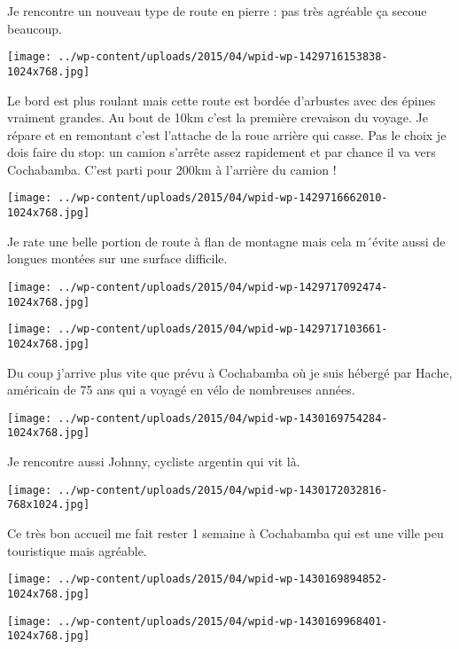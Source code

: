 \pagebreak
 Je rencontre un nouveau type de route en pierre : pas très agréable ça secoue beaucoup. 
\begin{center} \texttt{[image: ../wp-content/uploads/2015/04/wpid-wp-1429716153838-1024x768.jpg]} \end{center}

 Le bord est plus roulant mais cette route est bordée d'arbustes avec des épines vraiment grandes. Au bout de 10km c'est la première crevaison du voyage. Je répare et en remontant c'est l'attache de la roue arrière qui casse. 
 Pas le choix je dois faire du stop: un camion s'arrête assez rapidement et par chance il va vers Cochabamba. C'est parti pour 200km à l'arrière du camion ! 
\begin{center} \texttt{[image: ../wp-content/uploads/2015/04/wpid-wp-1429716662010-1024x768.jpg]} \end{center}

 Je rate une belle portion de route à flan de montagne mais cela m´évite aussi de longues montées sur une surface difficile. 
\begin{center} \texttt{[image: ../wp-content/uploads/2015/04/wpid-wp-1429717092474-1024x768.jpg]} \end{center}
\begin{center} \texttt{[image: ../wp-content/uploads/2015/04/wpid-wp-1429717103661-1024x768.jpg]} \end{center}

\pagebreak
 Du coup j'arrive plus vite que prévu à Cochabamba où je suis hébergé par Hache, américain de 75 ans qui a voyagé en vélo de nombreuses années. 
\begin{center} \texttt{[image: ../wp-content/uploads/2015/04/wpid-wp-1430169754284-1024x768.jpg]} \end{center}

 Je rencontre aussi Johnny, cycliste argentin qui vit là. 
\begin{center} \texttt{[image: ../wp-content/uploads/2015/04/wpid-wp-1430172032816-768x1024.jpg]} \end{center}

 Ce très bon accueil me fait rester 1 semaine à Cochabamba qui est une ville peu touristique mais agréable. 
\begin{center} \texttt{[image: ../wp-content/uploads/2015/04/wpid-wp-1430169894852-1024x768.jpg]} \end{center}
\begin{center} \texttt{[image: ../wp-content/uploads/2015/04/wpid-wp-1430169968401-1024x768.jpg]} \end{center}

